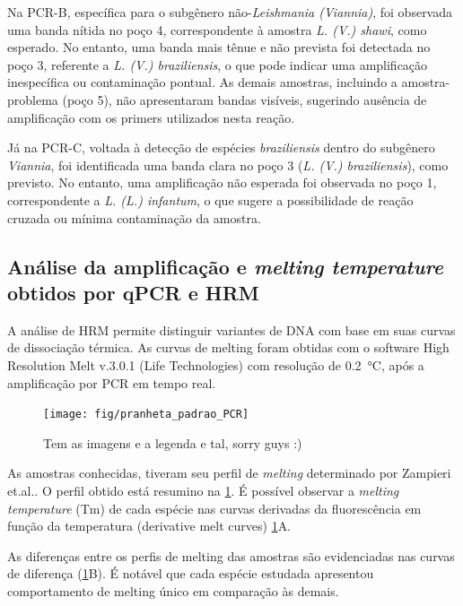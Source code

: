 
Na PCR-B, específica para o subgênero não-\textit{Leishmania (Viannia)}, foi observada uma banda nítida no poço 4, correspondente à amostra \textit{L. (V.) shawi}, como esperado. 
No entanto, uma banda mais tênue e não prevista foi detectada no poço 3, referente a \textit{L. (V.) braziliensis}, o que pode indicar uma amplificação inespecífica ou contaminação 
pontual. As demais amostras, incluindo a amostra-problema (poço 5), não apresentaram bandas visíveis, sugerindo ausência de amplificação com os primers utilizados nesta reação.

Já na PCR-C, voltada à detecção de espécies \textit{braziliensis} dentro do
subgênero \textit{Viannia}, foi identificada uma banda clara no poço 3 (\textit{L. (V.) braziliensis}), 
como previsto. No entanto, uma amplificação não esperada foi observada no poço 1, correspondente a \textit{L. (L.) infantum}, o que sugere a possibilidade de reação cruzada ou mínima 
contaminação da amostra.

\subsection{Análise da amplificação e \textit{melting temperature} obtidos por
qPCR e HRM}

A análise de HRM permite distinguir variantes de DNA com base em suas curvas de
dissociação térmica. As curvas de melting foram obtidas com o software High
Resolution Melt v.3.0.1 (Life Technologies) com resolução de
\qty{0,2}{\celsius}, após a amplificação por PCR em tempo real.

\begin{figure}
        \centering
        \texttt{[image: fig/pranheta\_padrao\_PCR]}
        \caption{Tem as imagens e a legenda e tal, sorry guys :)}
        \label{paduni}
\end{figure} 

As amostras conhecidas, tiveram seu perfil de \textit{melting} determinado por
Zampieri et.al.\cite{HRMzampi2016}. O perfil obtido está resumino na
\cref{paduni}.  É possível observar a \textit{melting temperature} (Tm) de cada
espécie nas curvas derivadas da fluorescência em função da temperatura
(derivative melt curves) \cref{paduni}A.

As diferenças entre os perfis de melting das amostras são evidenciadas nas
curvas de diferença (\cref{paduni}B).  É notável que cada espécie estudada
apresentou comportamento de melting único em comparação às demais. 

